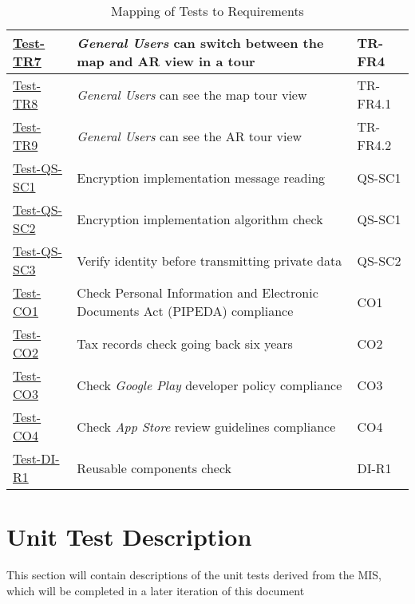\documentclass[12pt, titlepage]{article}
\begin{document}
\begin{enumerate}
\begin{table}[h!]
\begin{tabular}{|l|l|l|}
        \hline
        \hyperref[itm:Test-TR7]{Test-TR7} & \textit{General Users} can switch between the map and AR view in a tour & TR-FR4 \\
        \hline
        \hyperref[itm:Test-TR8]{Test-TR8} & \textit{General Users} can see the map tour view \label{itm:Test-TR8} & TR-FR4.1 \\
        \hline
        \hyperref[itm:Test-TR9]{Test-TR9} & \textit{General Users} can see the AR tour view & TR-FR4.2 \\
        \hline
        \hyperref[itm:Test-QS-SC1]{Test-QS-SC1} & Encryption implementation message reading & QS-SC1 \\
        \hline
        \hyperref[itm:Test-QS-SC2]{Test-QS-SC2} & Encryption implementation algorithm check & QS-SC1 \\
        \hline
        \hyperref[itm:Test-QS-SC3]{Test-QS-SC3} & Verify identity before transmitting private data & QS-SC2 \\
        \hline
        \hyperref[itm:Test-CO1]{Test-CO1} & Check Personal Information and Electronic
Documents Act (PIPEDA) \cite{PIPEDA} compliance & CO1 \\
        \hline
        \hyperref[itm:Test-CO2]{Test-CO2} & Tax records check going back six years & CO2 \\
        \hline
        \hyperref[itm:Test-CO3]{Test-CO3} & Check \textit{Google Play} developer policy \cite{GooglePlay} compliance & CO3 \\
        \hline
        \hyperref[itm:Test-CO4]{Test-CO4} & Check \textit{App Store} review guidelines \cite{AppStore} compliance & CO4 \\
        \hline
        \hyperref[itm:Test-DI-R1]{Test-DI-R1} & Reusable components check & DI-R1 \\
        \hline
    \end{tabular}
    \caption{Mapping of Tests to Requirements}
    \label{tab:test_requirements}
\end{table}

\pagebreak
  

\section{Unit Test Description}

This section will contain descriptions of the unit tests derived from the MIS, which will be completed in a later iteration of this document

\begin{comment}
\wss{This section should not be filled in until after the MIS (detailed design
  document) has been completed.}


\end{comment}
\end{enumerate}
\end{document}
